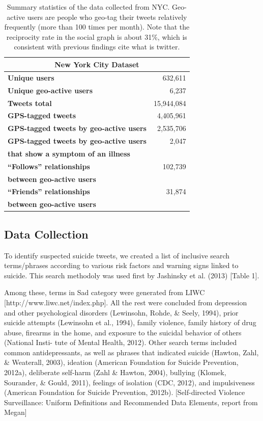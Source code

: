 \documentclass[11pt]{article}
\begin{document}
\begin{table}[t]
\small
\centering
\begin{tabular}{ l | r }
\multicolumn{2}{c}{\textbf{New York City Dataset}} \\
\hline
\textbf{Unique users}&       632,611      \\
\hline
\textbf{Unique geo-active users}&        6,237       \\
\hline
\textbf{Tweets total}&        15,944,084\\
\hline
\textbf{GPS-tagged tweets}&   4,405,961\\
\hline
\textbf{GPS-tagged tweets by geo-active users}&  2,535,706\\
\hline
\textbf{GPS-tagged tweets by geo-active users}&  2,047 \\
\textbf{that show a symptom of an illness}&\\
\hline
\textbf{``Follows'' relationships}&  102,739  \\
\textbf{between geo-active users}&\\
\hline
\textbf{``Friends'' relationships}&   31,874   \\
\textbf{between geo-active users}&\\
\end{tabular}
\caption{\small Summary statistics of the data collected from NYC. Geo-active users are people who geo-tag their tweets relatively frequently (more than 100 times per month). Note that the reciprocity rate in the social graph is about 31\%, which is consistent with previous findings  cite what is twitter.} 
\label{table::dataset}
\end{table}
\subsection{Data Collection}


To identify suspected suicide tweets, we created a list of inclusive search terms/phrases according to various risk factors and warning signs linked to suicide. This search methodoly was used first by Jashinsky et al. (2013) [Table 1].



Among these, terms in Sad category were generated from LIWC [http://www.liwc.net/index.php]. All the rest were concluded from depression and other psychological disorders (Lewinsohn, Rohde, \& Seely, 1994), prior suicide attempts (Lewinsohn et al., 1994), family violence, family history of drug abuse, firearms in the home, and exposure to the suicidal behavior of others (National Insti- tute of Mental Health, 2012). Other search terms included common antidepressants, as well as phrases that indicated suicide (Hawton, Zahl, \& Weaterall, 2003), ideation (American Foundation for Suicide Prevention, 2012a), deliberate self-harm (Zahl \& Hawton, 2004), bullying (Klomek, Sourander, \& Gould, 2011), feelings of isolation (CDC, 2012), and impulsiveness (American Foundation for Suicide Prevention, 2012b). [Self-directed Violence Surveillance: Uniform Definitions and Recommended Data Elements, report from Megan]
\end{document}
